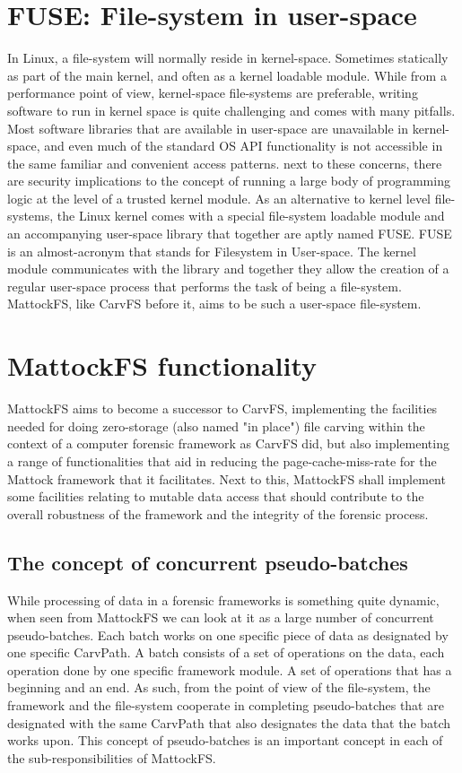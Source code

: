 \section{FUSE: File-system in user-space}
In Linux, a file-system will normally reside in kernel-space. Sometimes statically as part of the main kernel, and often as a kernel loadable module. While from a performance point of view, kernel-space file-systems are preferable, writing software to run in kernel space is quite challenging and comes with many pitfalls. Most software libraries that are available in user-space are unavailable in kernel-space, and even much of the standard OS API functionality is not accessible in the same familiar and convenient access patterns. next to these concerns, there are security implications to the concept of running a large body of programming logic at the level of a trusted kernel module. As an alternative to kernel level file-systems, the Linux kernel comes with a special file-system loadable module and an accompanying user-space library that together are aptly named FUSE. FUSE is an almost-acronym that stands for Filesystem in User-space. The kernel module communicates with the library and together they allow the creation of a regular user-space process that performs the task of being a file-system. MattockFS, like CarvFS before it, aims to be such a user-space file-system. 
\section{MattockFS functionality}
MattockFS aims to become a successor to CarvFS, implementing the facilities needed for doing zero-storage (also  named "in place") file carving within the context of a computer forensic framework as CarvFS did, but also implementing a range of functionalities that aid in reducing the page-cache-miss-rate for the Mattock framework that it facilitates. Next to this, MattockFS shall implement some facilities relating to mutable data access that should contribute to the overall robustness of the framework and the integrity of the forensic process.
\subsection{The concept of concurrent pseudo-batches}
While processing of data in a forensic frameworks is something quite dynamic, when seen from MattockFS we can look at it as a large number of concurrent pseudo-batches. Each batch works on one specific piece of data as designated by one specific CarvPath. A batch consists of a set of operations on the data, each operation done by one specific framework module. A set of operations that has a beginning and an end. As such, from the point of view of the file-system, the framework and the file-system cooperate in completing pseudo-batches that are designated with the same CarvPath that also designates the data that the batch works upon. This concept of pseudo-batches is an important concept in each of the sub-responsibilities of MattockFS.
